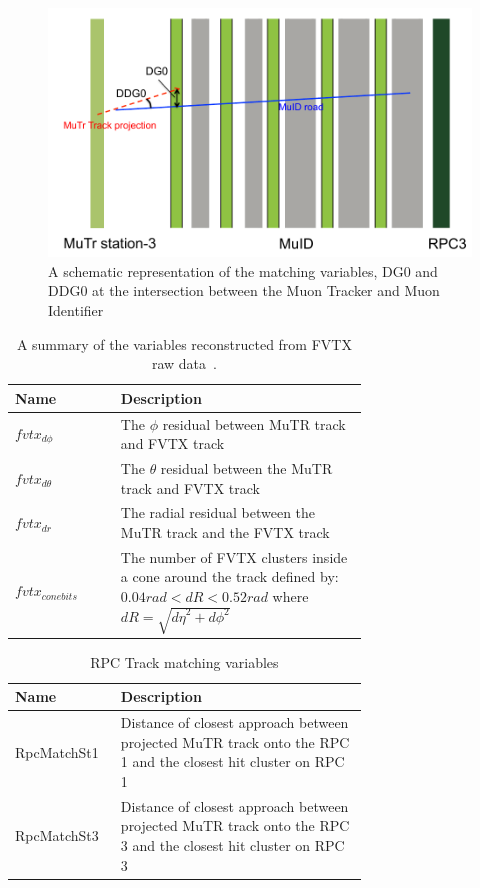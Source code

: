 \begin{figure}
  \centering
  \includegraphics[width=0.7\linewidth]{./figures/dg0_ddg0.png}
  \caption{
    A schematic representation of the matching variables, DG0 and DDG0 at
    the intersection between the Muon Tracker and Muon 
    Identifier~\cite{Oide2012}
  }
  \label{fig:dg0_ddg0}
\end{figure}

\begin{table}
  \centering
  \begin{tabular}{l p{0.7\linewidth}}
    \toprule
    \textbf{Name} & \textbf{Description} \\
    \midrule
    $fvtx_{d\phi}$ & The $\phi$ residual between MuTR track and FVTX track \\
    $fvtx_{d\theta}$ & The $\theta$ residual between the MuTR track and FVTX track \\
    $fvtx_{dr}$ & The radial residual between the MuTR track and the FVTX track \\
    $fvtx_{conebits}$ & The number of FVTX clusters inside a cone around the track defined by: $0.04 rad < dR < 0.52 rad$ where $dR = \sqrt{{d\eta}^2+{d\phi}^2}$\\
    \bottomrule
  \end{tabular}
  \caption{A summary of the variables reconstructed from FVTX raw data~\cite{Meles2015}.}
  \label{tab:fvtx_variables}
\end{table}

\begin{table}
  \centering
  \begin{tabular}{l p{0.7\linewidth}}
    \toprule
    \textbf{Name} & \textbf{Description} \\
    \midrule
    RpcMatchSt1 & Distance of closest approach between projected MuTR track onto the RPC 1 and the closest hit cluster on RPC 1\\
    RpcMatchSt3 & Distance of closest approach between projected MuTR track onto the RPC 3 and the closest hit cluster on RPC 3\\
    \bottomrule
  \end{tabular}
  \caption{RPC Track matching variables}
  \label{tab:rpc_variables}
\end{table}

